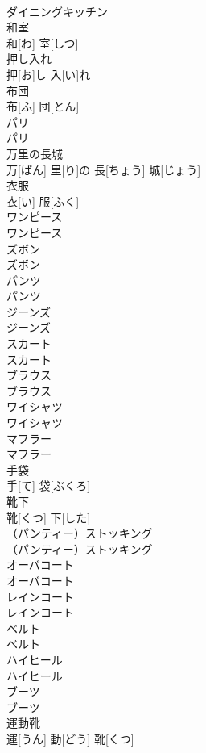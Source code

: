 \documentclass[8pt]{extreport}
\begin{document}
\begin{CJK}{UTF8}{min}
\\	ダイニングキッチン		
\\	和室	
\\	和[わ] 室[しつ]		
\\	押し入れ	
\\	押[お]し 入[い]れ		
\\	布団	
\\	布[ふ] 団[とん]		
\\	パリ	
\\	パリ		
\\	万里の長城	
\\	万[ばん] 里[り]の 長[ちょう] 城[じょう]		
\\	衣服	
\\	衣[い] 服[ふく]		
\\	ワンピース	
\\	ワンピース		
\\	ズボン	
\\	ズボン		
\\	パンツ	
\\	パンツ		
\\	ジーンズ	
\\	ジーンズ		
\\	スカート	
\\	スカート		
\\	ブラウス	
\\	ブラウス		
\\	ワイシャツ	
\\	ワイシャツ		
\\	マフラー	
\\	マフラー		
\\	手袋	
\\	手[て] 袋[ぶくろ]		
\\	靴下	
\\	靴[くつ] 下[した]		
\\	（パンティー）ストッキング	
\\	（パンティー）ストッキング		
\\	オーバコート	
\\	オーバコート		
\\	レインコート	
\\	レインコート		
\\	ベルト	
\\	ベルト		
\\	ハイヒール	
\\	ハイヒール		
\\	ブーツ	
\\	ブーツ		
\\	運動靴	
\\	運[うん] 動[どう] 靴[くつ]		

\end{CJK}
\end{document}
